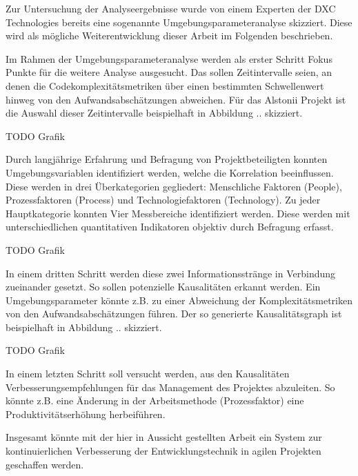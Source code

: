 Zur Untersuchung der Analyseergebnisse wurde von einem Experten der DXC
Technologies bereits eine sogenannte Umgebungsparameteranalyse
skizziert. Diese wird als mögliche Weiterentwicklung dieser Arbeit im
Folgenden beschrieben.

Im Rahmen der Umgebungsparameteranalyse werden als erster Schritt Fokus
Punkte für die weitere Analyse ausgesucht. Das sollen Zeitintervalle
seien, an denen die Codekomplexitätsmetriken über einen bestimmten
Schwellenwert hinweg von den Aufwandsabschätzungen abweichen. Für das
Alstonii Projekt ist die Auswahl dieser Zeitintervalle beispielhaft in
Abbildung .. skizziert.

TODO Grafik

Durch langjährige Erfahrung und Befragung von Projektbeteiligten konnten
Umgebungsvariablen identifiziert werden, welche die Korrelation
beeinflussen. Diese werden in drei Überkategorien gegliedert:
Menschliche Faktoren (People), Prozessfaktoren (Process) und
Technologiefaktoren (Technology). Zu jeder Hauptkategorie konnten Vier
Messbereiche identifiziert werden. Diese werden mit unterschiedlichen
quantitativen Indikatoren objektiv durch Befragung erfasst.

TODO Grafik

In einem dritten Schritt werden diese zwei Informationsstränge in Verbindung
zueinander gesetzt. So sollen potenzielle Kausalitäten erkannt werden.
Ein Umgebungsparameter könnte z.B. zu einer Abweichung der
Komplexitätsmetriken von den Aufwandsabschätzungen führen. Der so
generierte Kausalitätsgraph ist beispielhaft in Abbildung .. skizziert.

TODO Grafik

In einem letzten Schritt soll versucht werden, aus den Kausalitäten
Verbesserungsempfehlungen für das Management des Projektes abzuleiten.
So könnte z.B. eine Änderung in der Arbeitsmethode (Prozessfaktor) eine
Produktivitätserhöhung herbeiführen.

Insgesamt könnte mit der hier in Aussicht gestellten Arbeit ein System
zur kontinuierlichen Verbesserung der Entwicklungstechnik in agilen
Projekten geschaffen werden.
